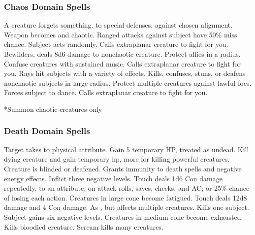\subsubsection{Chaos Domain Spells}

\begin{spelllist}
   A creature forgets something.
    to special defenses,  against chosen alignment.
   Weapon becomes  and chaotic.
   Ranged attacks against subject have 50\% miss chance.
   Subject acts randomly.
   Calls extraplanar creature to fight for you.
   Bewilders, deals 8d6 damage to nonchaotic creature.
   Protect allies in a \areamed radius.
   Confuse creatures with sustained music.
   Calls extraplanar creature to fight for you.
   Rays hit subjects with a variety of effects.
   Kills, confuses, stuns, or deafens nonchaotic subjects in large radius.
  \F Protect multiple creatures against lawful foes. 
  \spellhead[8]{}
   Forces subject to dance.
   Calls extraplanar creature to fight for you.
\end{spelllist}
*Summon chaotic creatures only

\subsubsection{Death Domain Spells}

\begin{spelllist}
   Target takes  to physical attribute.
   Gain 5 temporary HP, treated as undead.
   Kill dying creature and gain temporary hp, more for killing powerful creatures.
   Creature is blinded or deafened.
   Grants immunity to death spells and negative energy effects.
  \spellhead[3]{}
   Inflict three negative levels.
   Touch deals 1d6 Con damage repeatedly.
    to an attribute;  on attack rolls, saves, checks, and AC; or 25\% chance of losing each action.
   Creatures in large cone become fatigued.
  \spellhead[6]{}
   Touch deals 12d8 damage and 4 Con damage.
   As , but affects multiple creatures.
   Kills one subject.
   Subject gains six negative levels.
   Creatures in medium cone become exhausted.
   Kills bloodied creature.
   Scream kills many creatures. 
\end{spelllist}


